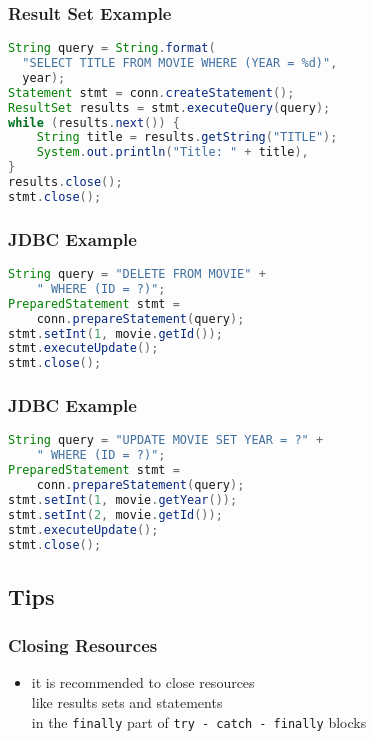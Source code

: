 \documentclass[dvipsnames]{beamer}
\theoremstyle{plain}
\begin{document}
\begin{frame}[fragile]
  \frametitle{Result Set Example}

  \begin{example}
    \begin{lstlisting}[language=Java]
String query = String.format(
  "SELECT TITLE FROM MOVIE WHERE (YEAR = %d)",
  year);
Statement stmt = conn.createStatement();
ResultSet results = stmt.executeQuery(query);
while (results.next()) {
    String title = results.getString("TITLE");
    System.out.println("Title: " + title),
}
results.close();
stmt.close();
    \end{lstlisting}
  \end{example}
\end{frame}

\begin{frame}[fragile]
  \frametitle{JDBC Example}

  \begin{example}[deleting]
    \begin{lstlisting}[language=Java]
String query = "DELETE FROM MOVIE" +
    " WHERE (ID = ?)";
PreparedStatement stmt =
    conn.prepareStatement(query);
stmt.setInt(1, movie.getId());
stmt.executeUpdate();
stmt.close();
    \end{lstlisting}
  \end{example}
\end{frame}

\begin{frame}[fragile]
  \frametitle{JDBC Example}

  \begin{example}[updating]
    \begin{lstlisting}[language=Java]
String query = "UPDATE MOVIE SET YEAR = ?" +
    " WHERE (ID = ?)";
PreparedStatement stmt =
    conn.prepareStatement(query);
stmt.setInt(1, movie.getYear());
stmt.setInt(2, movie.getId());
stmt.executeUpdate();
stmt.close();
    \end{lstlisting}
  \end{example}
\end{frame}

\subsection{Tips}

\begin{frame}
  \frametitle{Closing Resources}

  \begin{itemize}
    \item it is recommended to close resources\\
      like results sets and statements\\
      in the \lstinline!finally! part
      of \lstinline!try - catch - finally! blocks
  \end{itemize}
\end{frame}
\end{document}
